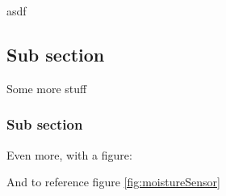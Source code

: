 asdf

\subsection{Sub section}

Some more stuff

\subsubsection{Sub section}

Even more, with a figure:


And to reference figure \ref{fig:moistureSensor}